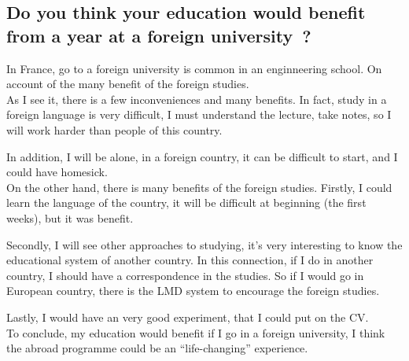 \documentclass[a4paper, 11pt]{book}
\begin{document}
	\maketitle
	\subsection*{Do you think your education would benefit from a year at a foreign university~?}
		In France, go to a foreign university is common in an enginneering school. On account of the many benefit of the foreign studies.\\

		As I see it, there is a few inconveniences and many benefits. In fact, study in a foreign language is very difficult, I must understand the lecture, take notes, so I will work harder than people of this country. 

		In addition, I will be alone, in a foreign country, it can be difficult to start, and I could have homesick. \\

		On the other hand, there is many benefits of the foreign studies. Firstly, I could learn the language of the country, it will be difficult at beginning (the first weeks), but it was benefit.

		Secondly, I will see other approaches to studying, it's very interesting to know the educational system of another country. In this connection, if I do in another country, I should have a correspondence in the studies. So if I would go in European country, there is the LMD system to encourage the foreign studies.

		Lastly, I would have an very good experiment, that I could put on the CV.\\

	To conclude, my education would benefit if I go in a foreign university, I think the abroad programme could be an ``life-changing'' experience.
\end{document}
